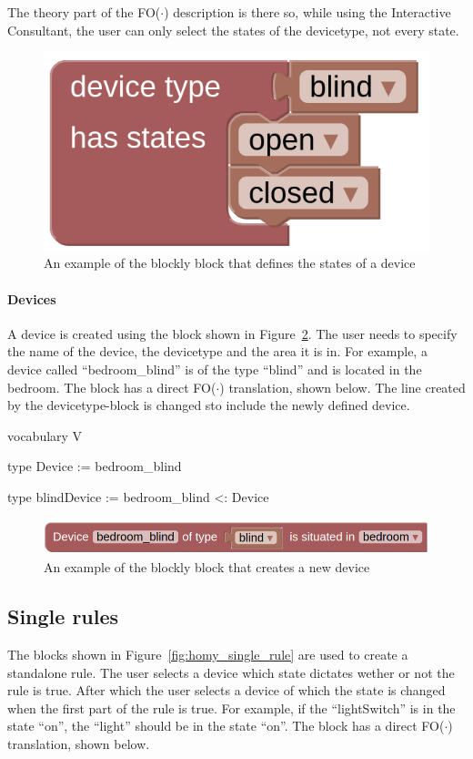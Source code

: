 \documentclass[11pt,a4paper]{report}
\newcommand{\fodot}{FO($\cdot$)\xspace}
\begin{document}
The theory part of the \fodot description is there so, while using the Interactive Consultant, the user can only select the states of the devicetype, not every state.

\begin{figure}
    \centering
    \includegraphics[width=0.4\linewidth]{images/homy_device_type.png}
    \caption{An example of the blockly block that defines the states of a device}
    \label{fig:homy_device_type}
\end{figure}

\paragraph{Devices}
A device is created using the block shown in Figure~\ref{fig:homy_device}. The user needs to specify the name of the device, the devicetype and the area it is in. For example, a device called ``bedroom_blind'' is of the type ``blind'' and is located in the bedroom. The block has a direct \fodot translation, shown below. The line created by the devicetype-block is changed sto include the newly defined device.

\begin{idplisting}
vocabulary V {
    type Device := {bedroom_blind} 

    type blindDevice := {bedroom_blind} <: Device
}
\end{idplisting}

\begin{figure}
    \centering
    \includegraphics[width=0.8\linewidth]{images/homy_device.png}
    \caption{An example of the blockly block that creates a new device}
    \label{fig:homy_device}
\end{figure}

\subsection{Single rules}
The blocks shown in Figure~\ref{fig:homy_single_rule} are used to create a standalone rule. The user selects a device which state dictates wether or not the rule is true. After which the user selects a device of which the state is changed when the first part of the rule is true. For example, if the ``lightSwitch'' is in the state ``on'', the ``light'' should be in the state ``on''. The block has a direct \fodot translation, shown below.
\end{document}
